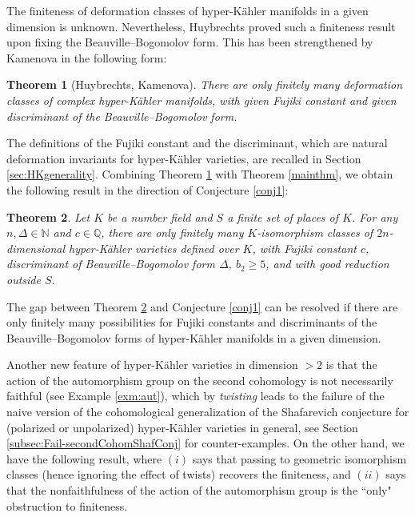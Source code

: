 \documentclass[11pt,reqno,oneside]{amsart}
\numberwithin{equation}{section}
\newtheorem{theorem}{Theorem}[section]
\theoremstyle{definition}
\newcommand{\NN}{\mathbb{N}}
\newcommand{\QQ}{\mathbb{Q}}
\begin{document}
The finiteness of deformation classes of hyper-Kähler manifolds in a given dimension is unknown. Nevertheless, Huybrechts \cite{Hu03} proved such a finiteness result upon fixing the Beauville--Bogomolov form. This has been strengthened by Kamenova \cite{Kamenova2018a} in the following form: 

\begin{theorem}[Huybrechts, Kamenova] \label{finitetype}
There are only finitely many deformation classes of complex hyper-Kähler manifolds, with given Fujiki constant and given discriminant of the Beauville--Bogomolov form. 
\end{theorem}

The definitions of the Fujiki constant and the discriminant, which are natural deformation invariants for hyper-Kähler varieties, are recalled in Section \ref{sec:HKgenerality}.
Combining Theorem \ref{finitetype} with Theorem \ref{mainthm}, we obtain the following result in the direction of Conjecture \ref{conj1}:
\begin{theorem}\label{mainthm2}
Let $K$ be a number field and $S$ a finite set of places of $K$.
For any $n, \Delta\in \NN$ and $c\in \QQ$, there are only finitely many $K$-isomorphism classes of $2n$-dimensional hyper-Kähler varieties defined over $K$, with Fujiki constant $c$, discriminant of Beauville--Bogomolov form $\Delta$, $b_2\geq 5$, and with good reduction outside $S$. 
\end{theorem}
 The gap between Theorem \ref{mainthm2} and Conjecture \ref{conj1} can be resolved if there are only finitely many possibilities for Fujiki constants and discriminants of the Beauville--Bogomolov forms of hyper-Kähler manifolds in a given dimension.  

\vspace{0.5cm}
Another new feature of hyper-Kähler varieties in dimension $>2$ is that the action of the automorphism group on the second cohomology is not necessarily faithful (see Example \ref{exm:aut}), which by \textit{twisting} \cite{BorelSerre} leads to the failure of the naive version of the cohomological generalization of the Shafarevich conjecture for (polarized or unpolarized) hyper-Kähler varieties in general, see Section \ref{subsec:Fail-secondCohomShafConj} for counter-examples. On the other hand, we have the following result, where $(i)$ says that passing to geometric isomorphism classes (hence ignoring the effect of twists) recovers the finiteness, and $(ii)$ says that the nonfaithfulness of the action of the automorphism group is the ``only" obstruction to finiteness.
\end{document}

